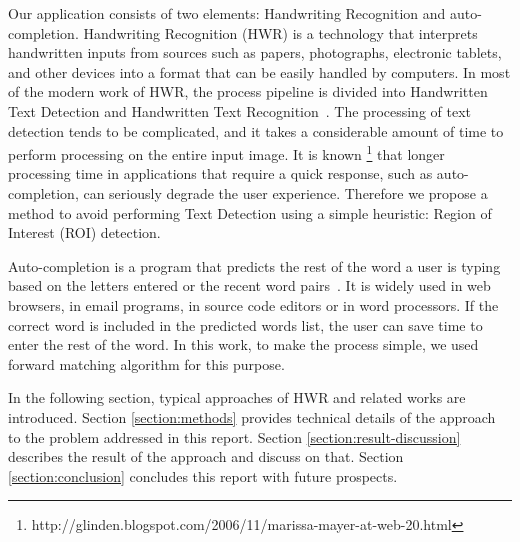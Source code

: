 Our application consists of two elements: Handwriting Recognition and auto-completion.
Handwriting Recognition (HWR) is a technology that
interprets handwritten inputs from sources such as papers,
photographs, electronic tablets, and other devices into a format
that can be easily handled by computers.
In most of the modern work of HWR, the process pipeline is divided into Handwritten Text Detection
and Handwritten Text Recognition~\cite{long2018scene}. The processing of text detection
tends to be complicated\cite{long2018scene}, and it takes a considerable amount of time to
perform processing on the entire input image. It is known
\footnote{http://glinden.blogspot.com/2006/11/marissa-mayer-at-web-20.html} that longer processing time
in applications that require a quick response, such as auto-completion,
can seriously degrade the user experience. Therefore we propose a method to avoid performing
Text Detection using a simple heuristic: Region of Interest (ROI) detection.

Auto-completion is a program that predicts the rest of the word a user is typing based on the letters entered
or the recent word pairs~\cite{darragh1990reactive}. It is widely used in web browsers, in email programs,
in source code editors or in word processors. If the correct word is included in the predicted words list,
the user can save time to enter the rest of the word. In this work, to make the process simple,
we used forward matching algorithm for this purpose.

In the following section, typical approaches of HWR and related works are introduced.
Section \ref{section:methods} provides technical details of the approach to the problem addressed in
this report. Section \ref{section:result-discussion} describes the result of the approach and discuss on that.
Section \ref{section:conclusion} concludes this report with future prospects.
